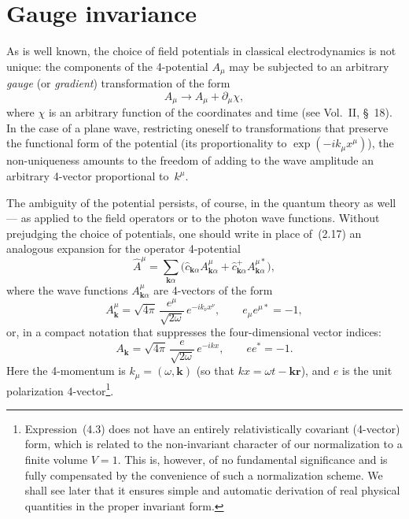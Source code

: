 \section{Gauge invariance}

As is well known, the choice of field potentials in classical electrodynamics is not unique: the components of the 4-potential $A_\mu$ may be subjected to an arbitrary \emph{gauge} (or \emph{gradient}) transformation of the form
\begin{equation}
A_\mu \to A_\mu + \partial_\mu\chi,
\tag{4.1}
\end{equation}
where $\chi$ is an arbitrary function of the coordinates and time (see Vol.~II, \S~18).
In the case of a plane wave, restricting oneself to transformations that preserve the functional form of the potential (its proportionality to $\exp(-ik_\mu x^\mu)$), the non-uniqueness amounts to the freedom of adding to the wave amplitude an arbitrary 4-vector proportional to~$k^\mu$.

The ambiguity of the potential persists, of course, in the quantum theory as well --- as applied to the field operators or to the photon wave functions. Without prejudging the choice of potentials, one should write in place of~(2.17) an analogous expansion for the operator 4-potential
\begin{equation}
\hat{A}^\mu = \sum_{\mathbf{k}\alpha} \bigl(\hat{c}_{\mathbf{k}\alpha} A^\mu_{\mathbf{k}\alpha} + \hat{c}^+_{\mathbf{k}\alpha} A^{\mu*}_{\mathbf{k}\alpha}\bigr),
\tag{4.2}
\end{equation}
where the wave functions $A^\mu_{\mathbf{k}\alpha}$ are 4-vectors of the form
\[
A^\mu_\mathbf{k} = \sqrt{4\pi}\,\frac{e^\mu}{\sqrt{2\omega}}\,e^{-ik_\nu x^\nu}, \qquad e_\mu e^{\mu*} = -1,
\]
or, in a compact notation that suppresses the four-dimensional vector indices:
\begin{equation}
A_\mathbf{k} = \sqrt{4\pi}\,\frac{e}{\sqrt{2\omega}}\,e^{-ikx}, \qquad ee^* = -1.
\tag{4.3}
\end{equation}
Here the 4-momentum is $k_\mu = (\omega, \mathbf{k})$ (so that $kx = \omega t - \mathbf{kr}$), and $e$ is the unit polarization 4-vector\footnote{Expression~(4.3) does not have an entirely relativistically covariant (4-vector) form, which is related to the non-invariant character of our normalization to a finite volume $V=1$. This is, however, of no fundamental significance and is fully compensated by the convenience of such a normalization scheme. We shall see later that it ensures simple and automatic derivation of real physical quantities in the proper invariant form.}.


